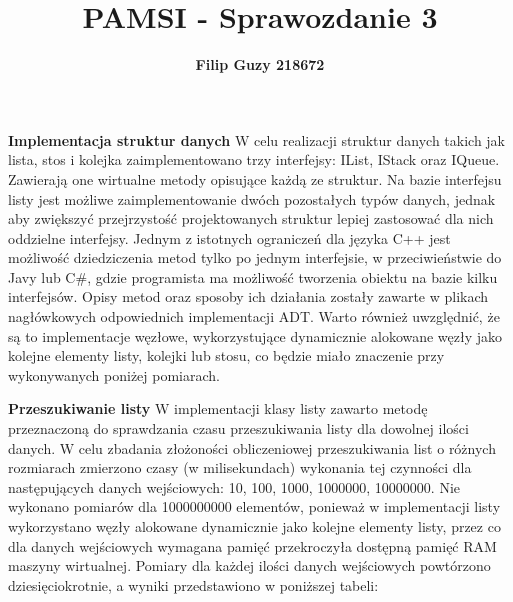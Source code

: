 \documentclass[10pt, a4paper]{article}
\title{\textbf{PAMSI - Sprawozdanie 3}}
\author{\textbf{Filip Guzy 218672}}
\begin{document}
\maketitle

\begin{flushleft}
\textbf{Implementacja struktur danych} \newline \newline
W celu realizacji struktur danych takich jak lista, stos i kolejka zaimplementowano trzy interfejsy: IList, IStack oraz IQueue. Zawierają one wirtualne metody opisujące każdą ze struktur. Na bazie interfejsu listy jest możliwe zaimplementowanie dwóch pozostałych typów danych, jednak aby zwiększyć przejrzystość projektowanych struktur lepiej zastosować dla nich oddzielne interfejsy. Jednym z istotnych ograniczeń dla języka C++ jest możliwość dziedziczenia metod tylko po jednym interfejsie, w przeciwieństwie do Javy lub C\#, gdzie programista ma możliwość tworzenia obiektu na bazie kilku interfejsów. Opisy metod oraz sposoby ich działania zostały zawarte w plikach nagłówkowych odpowiednich implementacji ADT. Warto również uwzględnić, że są to implementacje węzłowe, wykorzystujące dynamicznie alokowane węzły jako kolejne elementy listy, kolejki lub stosu, co będzie miało znaczenie przy wykonywanych poniżej pomiarach. \newline

\textbf{Przeszukiwanie listy} \newline \newline
W implementacji klasy listy zawarto metodę przeznaczoną do sprawdzania czasu przeszukiwania listy dla dowolnej ilości danych. W celu zbadania złożoności obliczeniowej przeszukiwania list o różnych rozmiarach zmierzono czasy (w milisekundach) wykonania tej czynności dla następujących danych wejściowych: 10, 100, 1000, 1000000, 10000000. Nie wykonano pomiarów dla 1000000000 elementów, ponieważ w implementacji listy wykorzystano węzły alokowane dynamicznie jako kolejne elementy listy, przez co dla danych wejściowych wymagana pamięć przekroczyła dostępną pamięć RAM maszyny wirtualnej. Pomiary dla każdej ilości danych wejściowych powtórzono dziesięciokrotnie, a wyniki przedstawiono w poniższej tabeli:


\end{flushleft}
\end{document}
